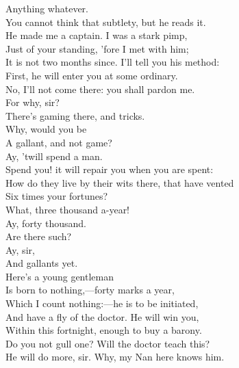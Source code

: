 \documentclass[a4paper,oneside,12pt]{memoir}
\begin{document}
\begin{drama*}
\facespeaks {} Anything whatever.\\
You cannot think that subtlety, but he reads it.\\
He made me a captain. I was a stark pimp,\\
Just of your standing, 'fore I met with him;\\
It is not two months since. I'll tell you his method:\\
First, he will enter you at some ordinary.\\
\kastrilspeaks No, I'll not come there: you shall pardon me.\\
\facespeaks {} For why, sir?\\
\kastrilspeaks There's gaming there, and tricks.\\
\facespeaks {} Why, would you be\\
A gallant, and not game?\\
\kastrilspeaks {} Ay, 'twill spend a man.\\
\facespeaks Spend you! it will repair you when you are spent:\\
How do they live by their wits there, that have vented\\
Six times your fortunes?\\
\kastrilspeaks {} What, three thousand a-year!\\
\facespeaks Ay, forty thousand.\\
\kastrilspeaks {} Are there such?\\
\facespeaks {} Ay, sir,\\
And gallants yet.\\
 Here's a young gentleman\\
Is born to nothing,---forty marks a year,\\
Which I count nothing:---he is to be initiated,\\
And have a fly of the doctor. He will win you,\\
Within this fortnight, enough to buy a barony.\\
\kastrilspeaks Do you not gull one?  Will the doctor teach this?\\
\facespeaks He will do more, sir. Why, my Nan here knows him.\\

\end{drama*}
\end{document}
